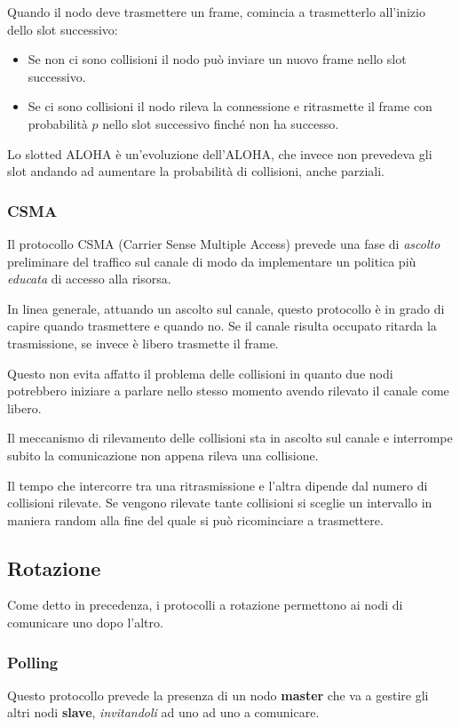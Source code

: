 Quando il nodo deve trasmettere un frame, comincia a trasmetterlo
all'inizio dello slot successivo:
\begin{itemize}
	\item Se non ci sono collisioni il nodo può inviare un nuovo
		frame nello slot successivo.
	\item Se ci sono collisioni il nodo rileva la connessione e 
		ritrasmette il frame con probabilità $p$ nello slot successivo
		finché non ha successo.
\end{itemize}
Lo slotted ALOHA è un'evoluzione dell'ALOHA, che invece non prevedeva
gli slot andando ad aumentare la probabilità di collisioni, anche 
parziali.

\subsubsection{CSMA}
Il protocollo CSMA (Carrier Sense Multiple Access) prevede una fase di
\emph{ascolto} preliminare del traffico sul canale di modo da 
implementare un politica più \emph{educata} di accesso alla risorsa.

In linea generale, attuando un ascolto sul canale, questo protocollo è
in grado di capire quando trasmettere e quando no. Se il canale risulta
occupato ritarda la trasmissione, se invece è libero trasmette il 
frame.

Questo non evita affatto il problema delle collisioni in quanto due
nodi potrebbero iniziare a parlare nello stesso momento avendo rilevato
il canale come libero.

Il meccanismo di rilevamento delle collisioni sta in ascolto sul
canale e interrompe subito la comunicazione non appena rileva una
collisione.

Il tempo che intercorre tra una ritrasmissione e l'altra dipende dal
numero di collisioni rilevate. Se vengono rilevate tante collisioni 
si sceglie un intervallo in maniera random alla fine del quale si può
ricominciare a trasmettere.

\subsection{Rotazione}
Come detto in precedenza, i protocolli a rotazione permettono ai nodi
di comunicare uno dopo l'altro.

\subsubsection{Polling}
Questo protocollo prevede la presenza di un nodo \textbf{master} che 
va a gestire gli altri nodi \textbf{slave}, \emph{invitandoli} ad uno
ad uno a comunicare.

